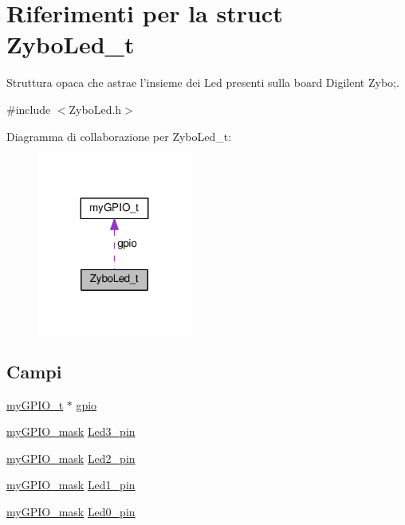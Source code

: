 \hypertarget{struct_zybo_led__t}{\section{Riferimenti per la struct Zybo\+Led\+\_\+t}
\label{struct_zybo_led__t}
}


Struttura opaca che astrae l'insieme dei Led presenti sulla board Digilent Zybo;.  




{\ttfamily \#include $<$Zybo\+Led.\+h$>$}



Diagramma di collaborazione per Zybo\+Led\+\_\+t\+:
\nopagebreak
\begin{figure}[H]
\begin{center}
\leavevmode
\includegraphics[width=143pt]{struct_zybo_led__t__coll__graph}
\end{center}
\end{figure}
\subsection*{Campi}
\begin{DoxyCompactItemize}
\item 
\hyperlink{structmy_g_p_i_o__t}{my\+G\+P\+I\+O\+\_\+t} $\ast$ \hyperlink{struct_zybo_led__t_ac37ddc7c58d246d233dfb38037020184}{gpio}
\item 
\hyperlink{group__my_g_p_i_o_ga402a0d20afc0cb7c25554b8b023f4253}{my\+G\+P\+I\+O\+\_\+mask} \hyperlink{struct_zybo_led__t_afc64d1407f30615e374bf9f06721842a}{Led3\+\_\+pin}
\item 
\hyperlink{group__my_g_p_i_o_ga402a0d20afc0cb7c25554b8b023f4253}{my\+G\+P\+I\+O\+\_\+mask} \hyperlink{struct_zybo_led__t_a4213c78e5a02b1476222e989c2eceb04}{Led2\+\_\+pin}
\item 
\hyperlink{group__my_g_p_i_o_ga402a0d20afc0cb7c25554b8b023f4253}{my\+G\+P\+I\+O\+\_\+mask} \hyperlink{struct_zybo_led__t_adc78fb167f1dd6693910813d4ec5930e}{Led1\+\_\+pin}
\item 
\hyperlink{group__my_g_p_i_o_ga402a0d20afc0cb7c25554b8b023f4253}{my\+G\+P\+I\+O\+\_\+mask} \hyperlink{struct_zybo_led__t_ac5afef2eef91d5533a23435cfcc60104}{Led0\+\_\+pin}
\end{DoxyCompactItemize}


